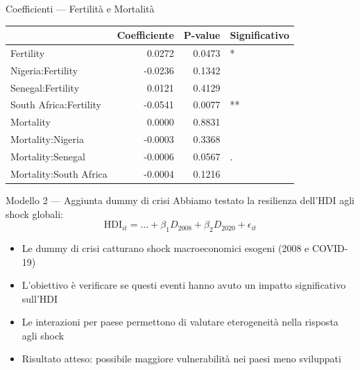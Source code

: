 \documentclass[
  ignorenonframetext,
  aspectratio=43,
]{beamer}
\begin{document}
\begin{frame}{Coefficienti --- Fertilità e Mortalità}
\protect{}\label{coefficienti-fertilituxe0-e-mortalituxe0}
\begin{tabular}{lrrl}
\toprule
  & Coefficiente & P-value & Significativo\\
\midrule
Fertility & 0.0272 & 0.0473 & *\\
Nigeria:Fertility & -0.0236 & 0.1342 & \\
Senegal:Fertility & 0.0121 & 0.4129 & \\
South Africa:Fertility & -0.0541 & 0.0077 & **\\
Mortality & 0.0000 & 0.8831 & \\
\addlinespace
Mortality:Nigeria & -0.0003 & 0.3368 & \\
Mortality:Senegal & -0.0006 & 0.0567 & .\\
Mortality:South Africa & -0.0004 & 0.1216 & \\
\bottomrule
\end{tabular}
\end{frame}

\begin{frame}{Modello 2 --- Aggiunta dummy di crisi}
\protect{}\label{modello-2-aggiunta-dummy-di-crisi}
Abbiamo testato la resilienza dell'HDI agli shock globali:
\[\text{HDI}_{it} = \dots + \beta_1 D_{2008} + \beta_2 D_{2020} + \epsilon_{it}\]

\begin{itemize}
  \item Le dummy di crisi catturano shock macroeconomici esogeni (2008 e COVID-19)
  \item L’obiettivo è verificare se questi eventi hanno avuto un impatto significativo sull’HDI
  \item Le interazioni per paese permettono di valutare eterogeneità nella risposta agli shock
  \item Risultato atteso: possibile maggiore vulnerabilità nei paesi meno sviluppati
\end{itemize}
\end{frame}
\end{document}
